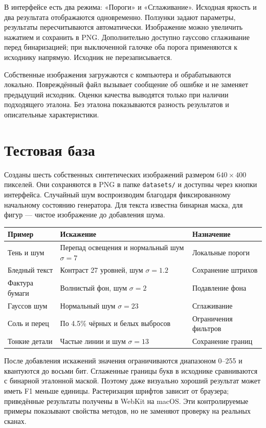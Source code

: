 \documentclass[12pt,a4paper]{article}
\begin{document}
В интерфейсе есть два режима: «Пороги» и «Сглаживание». Исходная яркость и два результата отображаются одновременно. Ползунки задают параметры, результаты пересчитываются автоматически. Изображение можно увеличить нажатием и сохранить в PNG. Дополнительно доступно гауссово сглаживание перед бинаризацией; при выключенной галочке оба порога применяются к исходнику напрямую. Исходник не перезаписывается.

Собственные изображения загружаются с компьютера и обрабатываются локально. Повреждённый файл вызывает сообщение об ошибке и не заменяет предыдущий исходник. Оценки качества выводятся только при наличии подходящего эталона. Без эталона показываются разность результатов и описательные характеристики.

\section{Тестовая база}
Созданы шесть собственных синтетических изображений размером $640\times400$ пикселей. Они сохраняются в PNG в папке \texttt{datasets/} и доступны через кнопки интерфейса. Случайный шум воспроизводим благодаря фиксированному начальному состоянию генератора. Для текста известна бинарная маска, для фигур --- чистое изображение до добавления шума.

\begin{center}\small
\begin{tabularx}{\linewidth}{lXl}\toprule
Пример & Искажение & Назначение\\\midrule
Тень и шум & Перепад освещения и нормальный шум $\sigma=7$ & Локальные пороги\\
Бледный текст & Контраст 27 уровней, шум $\sigma=1.2$ & Сохранение штрихов\\
Фактура бумаги & Волнистый фон, шум $\sigma=2$ & Подавление фона\\
Гауссов шум & Нормальный шум $\sigma=23$ & Сглаживание\\
Соль и перец & По 4.5\% чёрных и белых выбросов & Ограничения фильтров\\
Тонкие детали & Частые линии и шум $\sigma=13$ & Сохранение границ\\\bottomrule
\end{tabularx}
\end{center}
После добавления искажений значения ограничиваются диапазоном 0--255 и квантуются до восьми бит. Сглаженные границы букв в исходнике сравниваются с бинарной эталонной маской. Поэтому даже визуально хороший результат может иметь F1 меньше единицы. Растеризация шрифтов зависит от браузера; приведённые результаты получены в WebKit на macOS. Эти контролируемые примеры показывают свойства методов, но не заменяют проверку на реальных сканах.
\end{document}
